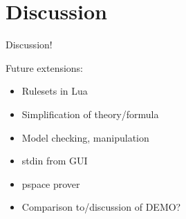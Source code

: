 \section{Discussion}
\label{sec:discussion}

Discussion!

Future extensions:
\begin{itemize}
\item Rulesets in Lua
\item Simplification of theory/formula
\item Model checking, manipulation
\item stdin from GUI
\item {\sc pspace} prover
\item Comparison to/discussion of DEMO?
\end{itemize}
